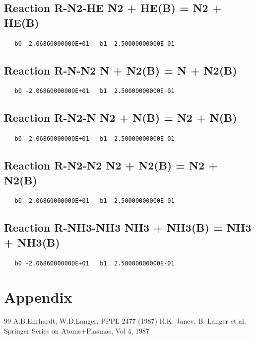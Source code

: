 \documentclass[12pt]{article}
\begin{document}
\subsection{
Reaction R-N2-HE N2 + HE(B) = N2 + HE(B) }
\begin{small}\begin{verbatim}
   b0 -2.06860000000E+01   b1  2.50000000000E-01
\end{verbatim}\end{small}
\newpage

\subsection{
Reaction R-N-N2 N + N2(B) = N + N2(B) }
\begin{small}\begin{verbatim}
   b0 -2.06860000000E+01   b1  2.50000000000E-01
\end{verbatim}\end{small}
\newpage

\subsection{
Reaction R-N2-N N2 + N(B) = N2 + N(B) }
\begin{small}\begin{verbatim}
   b0 -2.06860000000E+01   b1  2.50000000000E-01
\end{verbatim}\end{small}
\newpage

\subsection{
Reaction R-N2-N2 N2 + N2(B) = N2 + N2(B) }
\begin{small}\begin{verbatim}
   b0 -2.06860000000E+01   b1  2.50000000000E-01
\end{verbatim}\end{small}
\newpage

\subsection{
Reaction R-NH3-NH3 NH3 + NH3(B) = NH3 + NH3(B) }
\begin{small}\begin{verbatim}
   b0 -2.06860000000E+01   b1  2.50000000000E-01
\end{verbatim}\end{small}
\newpage


\section{Appendix}
\newpage
\begin{thebibliography}{99}
  A.B.Ehrhardt, W.D.Langer, PPPL 2477 (1987)
 R.K. Janev, B. Langer et al.  Springer Series on Atoms+Plasmas,
                   Vol 4, 1987
 \end{thebibliography}
\end{document}
